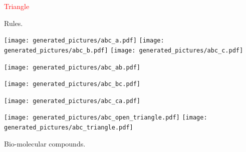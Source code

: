 \documentclass[landscape,20pt]{transparents2e}
\newcommand{\red}{\textcolor{red}}
\renewcommand{\frametitle}[1]{\red{\HUGE #1 }}
\begin{document}
\begin{slide}{\frametitle{Triangle}}

  \begin{minipage}{0.55\linewidth}
  \begin{minipage}{\linewidth}
     \begin{center}
    \end{center}
    \vspace*{1cm}
  \begin{center}
  \end{center}
  \vspace*{1cm}
  \begin{center}
  \end{center}
  \end{minipage}

  \begin{center}
  Rules.
  \end{center}
  \end{minipage}
  \begin{minipage}{0.44\linewidth}
\texttt{[image: generated\_pictures/abc\_a.pdf]}
\hspace*{1cm}
\texttt{[image: generated\_pictures/abc\_b.pdf]}
\hspace*{1cm}
\texttt{[image: generated\_pictures/abc\_c.pdf]}

\vspace*{1cm}

\hspace*{1cm}\begin{minipage}{0.5\linewidth}
  \texttt{[image: generated\_pictures/abc\_ab.pdf]}

\vspace*{5mm}

\texttt{[image: generated\_pictures/abc\_bc.pdf]}

\vspace*{5mm}

\texttt{[image: generated\_pictures/abc\_ca.pdf]}
\end{minipage}

\vspace*{1cm}

\texttt{[image: generated\_pictures/abc\_open\_triangle.pdf]}
\texttt{[image: generated\_pictures/abc\_triangle.pdf]}


    \begin{center}
      Bio-molecular compounds.
    \end{center}
  \end{minipage}

\end{slide}
\end{document}
